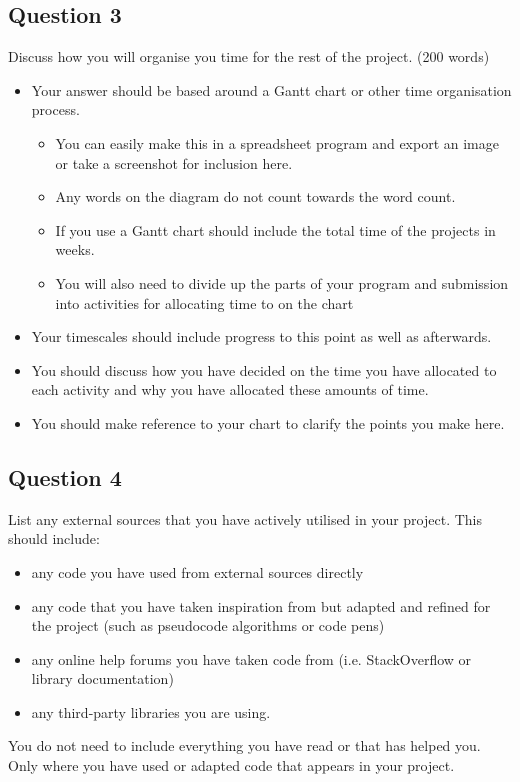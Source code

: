\subsection*{Question 3}
Discuss how you will organise you time for the rest of the project. (200 words)
\begin{itemize}
  \item Your answer should be based around a Gantt chart or other time organisation process.
  \begin{itemize}
    \item You can easily make this in a spreadsheet program and export an image or take a screenshot for inclusion here.
    \item Any words on the diagram do not count towards the word count.
    \item If you use a Gantt chart should include the total time of the projects in weeks.
    \item You will also need to divide up the parts of your program and submission into activities for allocating time to on the chart
  \end{itemize}
  \item Your timescales should include progress to this point as well as afterwards.
  \item You should discuss how you have decided on the time you have allocated to each activity and why you have allocated these amounts of time.
  \item You should make reference to your chart to clarify the points you make here.
\end{itemize}

\subsection*{Question 4}
List any external sources that you have actively utilised in your project. This should include:
\begin{itemize}
  \item any code you have used from external sources directly
  \item any code that you have taken inspiration from but adapted and refined for the project (such as pseudocode algorithms or code pens)
  \item any online help forums you have taken code from (i.e. StackOverflow or library documentation)
  \item any third-party libraries you are using.
\end{itemize}
You do not need to include everything you have read or that has helped you.
Only where you have used or adapted code that appears in your project.

